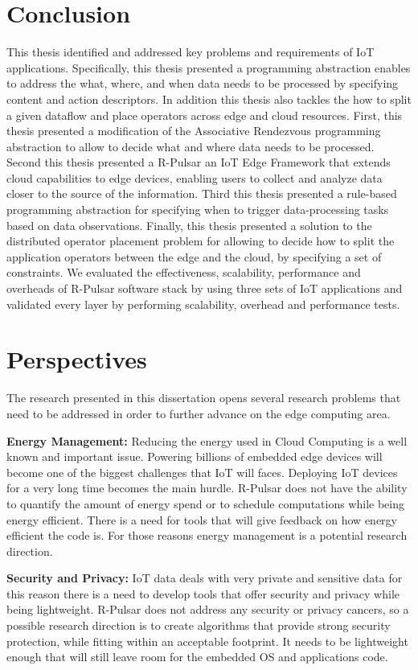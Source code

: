 \section{Conclusion}
This thesis identified and addressed key problems and requirements of IoT applications. Specifically, this thesis presented a programming abstraction enables to address the what, where, and when data needs to be processed by specifying content and action descriptors. In addition this thesis also tackles the how to split a given dataflow and place operators across edge and cloud resources. First, this thesis presented a modification of the Associative Rendezvous programming abstraction to allow to decide what and where data needs to be processed. Second this thesis presented a R-Pulsar an IoT Edge Framework that extends cloud capabilities to edge devices, enabling users to collect and analyze data closer to the source of the information. Third this thesis presented a rule-based programming abstraction for specifying when to trigger data-processing tasks based on data observations. Finally, this thesis presented a solution to the distributed operator placement problem for allowing to decide how to split the application operators between the edge and the cloud, by specifying a set of constraints. We evaluated the effectiveness, scalability, performance and overheads of R-Pulsar software stack by using three sets of IoT applications and validated every layer by performing scalability, overhead and performance tests.

\section{Perspectives}
The research presented in this dissertation opens several research problems that need to be addressed in order to further advance on the edge computing area.

\textbf{Energy Management:} Reducing the energy used in Cloud Computing is a well known and important issue. Powering billions of embedded edge devices will become one of the biggest challenges that IoT will faces. Deploying IoT devices for a very long time becomes the main hurdle. R-Pulsar does not have the ability to quantify the amount of energy spend or to schedule computations while being energy efficient. There is a need for tools that will give feedback on how energy efficient the code is. For those reasons energy management is a potential research direction. 

\textbf{Security and Privacy:} IoT data deals with very private and sensitive data for this reason there is a need to develop tools that offer security and privacy while being lightweight. R-Pulsar does not address any security or privacy cancers, so a possible research direction is to create algorithms that provide strong security protection, while fitting within an acceptable footprint. It needs to be lightweight enough that will still leave room for the embedded OS and applications code. 

